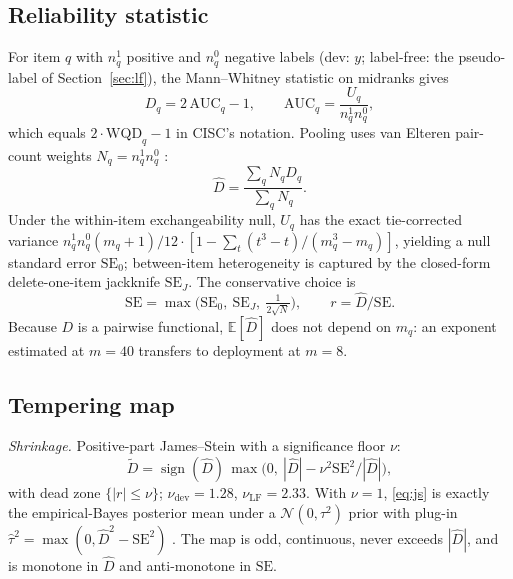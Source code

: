 \documentclass[conference]{IEEEtran}
\newcommand{\Dhat}{\widehat{D}}
\newcommand{\sign}{\operatorname{sign}}
\begin{document}
\subsection{Reliability statistic}
For item $q$ with $n^1_q$ positive and $n^0_q$ negative labels (dev: $y$; label-free: the pseudo-label of Section~\ref{sec:lf}), the Mann--Whitney statistic on midranks gives
\begin{equation}
D_q = 2\,\mathrm{AUC}_q-1,\qquad \mathrm{AUC}_q=\frac{U_q}{n^1_q n^0_q},
\end{equation}
which equals $2\cdot\mathrm{WQD}_q-1$ in CISC's notation. Pooling uses van Elteren pair-count weights $N_q=n^1_q n^0_q$ \cite{vanelteren1960}:
\begin{equation}\label{eq:pooled}
\Dhat=\frac{\sum_q N_q D_q}{\sum_q N_q}.
\end{equation}
Under the within-item exchangeability null, $U_q$ has the exact tie-corrected variance $n^1_qn^0_q(m_q{+}1)/12\cdot[1-\sum_t(t^3-t)/(m_q^3-m_q)]$, yielding a null standard error $\mathrm{SE}_0$; between-item heterogeneity is captured by the closed-form delete-one-item jackknife $\mathrm{SE}_J$. The conservative choice is
\begin{equation}
\mathrm{SE}=\max\big(\mathrm{SE}_0,\ \mathrm{SE}_J,\ \tfrac{1}{2\sqrt{N}}\big),\qquad r=\Dhat/\mathrm{SE}.
\end{equation}
Because $D$ is a pairwise functional, $\mathbb{E}[\Dhat]$ does not depend on $m_q$: an exponent estimated at $m{=}40$ transfers to deployment at $m{=}8$.

\subsection{Tempering map}
\emph{Shrinkage.} Positive-part James--Stein with a significance floor $\nu$:
\begin{equation}\label{eq:js}
\tilde D=\sign(\Dhat)\,\max\!\big(0,\ |\Dhat|-\nu^2\mathrm{SE}^2/|\Dhat|\big),
\end{equation}
with dead zone $\{|r|\le\nu\}$; $\nu_{\mathrm{dev}}=1.28$, $\nu_{\mathrm{LF}}=2.33$. With $\nu=1$, \eqref{eq:js} is exactly the empirical-Bayes posterior mean under a $\mathcal{N}(0,\tau^2)$ prior with plug-in $\hat\tau^2=\max(0,\Dhat^2-\mathrm{SE}^2)$ \cite{james1961estimation}. The map is odd, continuous, never exceeds $|\Dhat|$, and is monotone in $\Dhat$ and anti-monotone in $\mathrm{SE}$.
\end{document}
